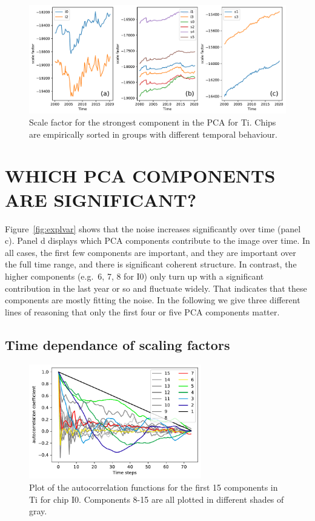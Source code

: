 \documentclass[]{spie}  %
\begin{document}
\begin{figure} [ht]
  \begin{center}
    \includegraphics[width=\textwidth]{figures/comparechips.pdf}
  \end{center}
  \caption
      {Scale factor for the strongest component in the PCA for Ti. Chips are empirically sorted in groups with different temporal behaviour.
      \label{fig:comparechips}}
\end{figure}


\section{WHICH PCA COMPONENTS ARE SIGNIFICANT?}

Figure~\ref{fig:explvar} shows that the noise increases significantly over time (panel c). Panel d displays which PCA components contribute to the image over time. In all cases, the first few components are important, and they are important over the full time range, and there is significant coherent structure. In contrast, the higher components (e.g.\ 6, 7, 8 for I0) only turn up with a significant contribution in the last year or so and fluctuate widely. That indicates that these components are mostly fitting the noise. In the following we give three different lines of reasoning that only the first four or five PCA components matter.


\subsection{Time dependance of scaling factors}
\begin{figure} [ht]
  \begin{center}
    \includegraphics[height=5cm]{figures/autocorr.pdf}
  \end{center}
  \caption
      {Plot of the autocorrelation functions for the first 15 components in Ti for chip I0. Components 8-15 are all plotted in different shades of gray.
        \label{fig:time}}
\end{figure}
\end{document}
